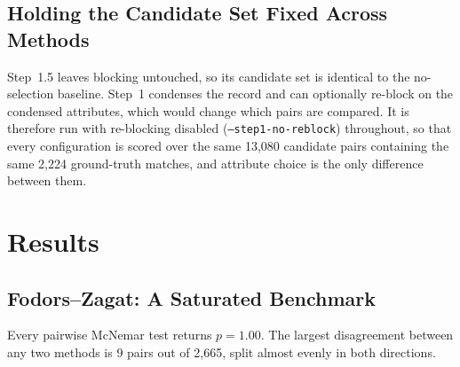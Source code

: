 \documentclass[11pt]{article}
\begin{document}
\subsection{Holding the Candidate Set Fixed Across Methods}
\label{sec:reblock}

Step~1.5 leaves blocking untouched, so its candidate set is identical to the no-selection
baseline. Step~1 condenses the record and can optionally re-block on the condensed
attributes, which would change which pairs are compared. It is therefore run with
re-blocking disabled (\texttt{--step1-no-reblock}) throughout, so that every configuration is
scored over the same 13{,}080 candidate pairs containing the same 2{,}224 ground-truth
matches, and attribute choice is the only difference between them.

\section{Results}

\subsection{Fodors--Zagat: A Saturated Benchmark}

\begin{table}[h]
\centering
{}
\caption{Fodors--Zagat, \texttt{class} excluded. 2{,}665 candidate pairs, 110 ground-truth
matches. Metrics are end-to-end. All rows use the cumulative rule at its 0.8 default.}
\end{table}

Every pairwise McNemar test returns $p = 1.00$. The largest disagreement between any two
methods is 9 pairs out of 2{,}665, split almost evenly in both directions.
\end{document}
